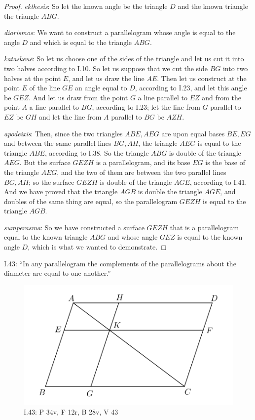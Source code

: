 \documentclass{article}
\begin{document}
\begin{proof}
{\em ekthesis}: So let the known angle be the triangle $D$ and the known triangle  the triangle $ABG$.

{\em diorismos}: We want to construct a parallelogram whose angle is equal to the angle $D$ and which is equal to the triangle $ABG$.

{\em kataskeu\={e}}: So let us choose one of the sides of the triangle and let us cut it into two halves according to I.10. So let us suppose that we cut the side
$BG$ into two halves at the point $E$, and let us draw the line $AE$. Then let us construct at the point $E$ of the line $GE$ an angle
equal to $D$, according to I.23, and let this angle be $GEZ$. 
And let us draw from the point $G$ a line parallel to $EZ$ and from the point $A$ a line parallel to $BG$, according
to I.23; let the line from $G$ parallel to $EZ$ be $GH$ and let the line from $A$ parallel to $BG$ be $AZH$. 

{\em apodeixis}: Then, since the two triangles $ABE,AEG$ are upon equal bases $BE,EG$ and between
the same parallel lines $BG,AH$, the triangle $AEG$ is equal to the triangle $ABE$, according to
I.38. So the triangle $ABG$ is double of the triangle $AEG$. But the surface $GEZH$ is a parallelogram,
and its base $EG$ is the  base of the triangle $AEG$, and the two of them are between the 
two parallel lines $BG,AH$; so
the surface $GEZH$ is double of the triangle $AGE$, according to I.41. 
And we have proved that the triangle $AGB$ is double the triangle $AGE$, and doubles of the same thing are equal,
so the parallelogram $GEZH$ is equal to the triangle $AGB$.

{\em sumperasma}: So we have constructed a surface $GEZH$ that is a parallelogram equal to the known
triangle $ABG$ and whose angle
$GEZ$ is equal to the known angle $D$, which is what we wanted to demonstrate.
\end{proof}




I.43: ``In any parallelogram the complements of the parallelograms
about the diameter are equal to one another.''

\begin{figure}
\begin{center}
\includegraphics{I43.png}
\end{center}
\caption{I.43: P 34v, F 12r, B 28v, V 43}
\label{I43}
\end{figure}
\end{document}
